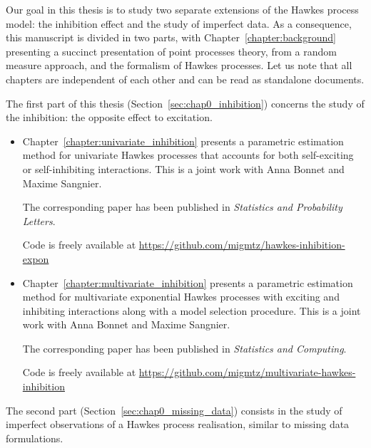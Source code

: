     Our goal in this thesis is to study two separate extensions of the Hawkes process model: the inhibition effect and the study of imperfect data.
    As a consequence, this manuscript is divided in two parts, with Chapter~\ref{chapter:background} presenting a succinct presentation of point processes theory, from a random measure approach, and the formalism of Hawkes processes.
    Let us note that all chapters are independent of each other and can be read as standalone documents.

    The first part of this thesis (Section~\ref{sec:chap0_inhibition}) concerns the study of the inhibition: 
    the opposite effect to excitation.

    \begin{itemize}
      \item Chapter~\ref{chapter:univariate_inhibition} presents a parametric estimation method for univariate Hawkes processes that accounts for both self-exciting or self-inhibiting interactions. 
      This is a joint work with Anna Bonnet and Maxime Sangnier. 

      The corresponding paper \parencite{bonnet2021} has been published in \textit{Statistics and Probability Letters}.
      
      Code is freely available at \url{https://github.com/migmtz/hawkes-inhibition-expon}

      \item Chapter~\ref{chapter:multivariate_inhibition} presents a parametric estimation method for multivariate exponential Hawkes processes with exciting and inhibiting interactions along with a model selection procedure. 
      This is a joint work with Anna Bonnet and Maxime Sangnier. 

      The corresponding paper \parencite{Bonnet2023} has been published in \textit{Statistics and Computing}.
      
      Code is freely available at \url{https://github.com/migmtz/multivariate-hawkes-inhibition}

    \end{itemize}

    The second part (Section~\ref{sec:chap0_missing_data}) consists in the study of imperfect observations of a Hawkes process realisation, similar to missing data formulations.

